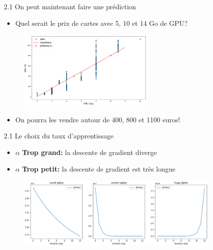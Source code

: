 \begin{frame}{2.1 On peut maintenant faire une prédiction}
  \begin{itemize}
  \item Quel serait le prix de cartes avec 5, 10 et 14 Go de GPU? 
  \end{itemize}
  \vspace{-0.2cm}
  \begin{figure}
    \includegraphics[width=0.6\textwidth]{fig/pred.png}
  \end{figure}
  \vspace{-0.5cm}
  \begin{itemize}
  \item On pourra les vendre autour de 400, 800 et 1100 euros!
  \end{itemize} 
\end{frame}

\begin{frame}{2.1 Le choix du taux d'apprentissage}
  \begin{itemize}
  \item \boldmath $\alpha$ \textbf{Trop grand:} la descente de gradient diverge
  \item \boldmath $\alpha$ \textbf{Trop petit:} la descente de gradient est très longue
  \end{itemize}
  \begin{figure}
    \includegraphics[width=0.9\textwidth]{fig/learningRateChoice.png}
  \end{figure}
\end{frame}

